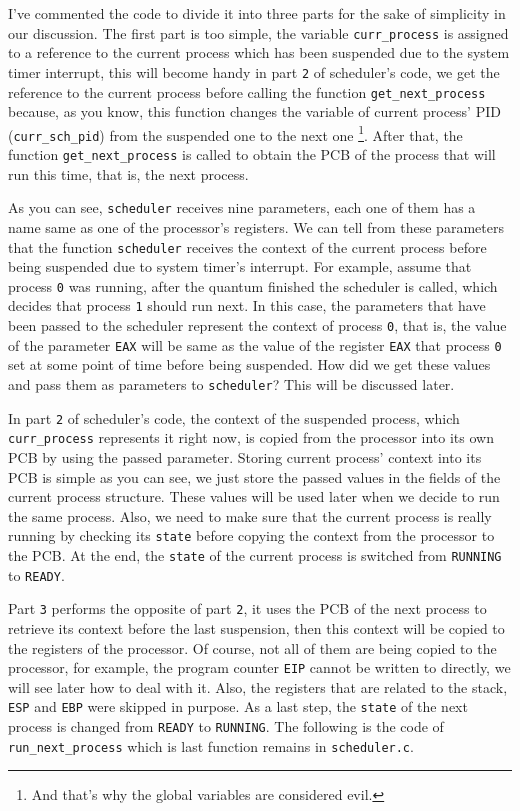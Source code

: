 I've commented the code to divide it into three parts for the sake of
simplicity in our discussion. The first part is too simple, the variable
\lstinline!curr_process! is assigned to a reference to the current
process which has been suspended due to the system timer interrupt, this
will become handy in part \lstinline!2! of scheduler's code, we get the
reference to the current process before calling the function
\lstinline!get_next_process! because, as you know, this function changes
the variable of current process' PID (\lstinline!curr_sch_pid!) from the
suspended one to the next one \footnote{And that's why the global
  variables are considered evil.}. After that, the function
\lstinline!get_next_process! is called to obtain the PCB of the process
that will run this time, that is, the next process.

As you can see, \lstinline!scheduler! receives nine parameters, each one
of them has a name same as one of the processor's registers. We can tell
from these parameters that the function \lstinline!scheduler! receives
the context of the current process before being suspended due to system
timer's interrupt. For example, assume that process \lstinline!0! was
running, after the quantum finished the scheduler is called, which
decides that process \lstinline!1! should run next. In this case, the
parameters that have been passed to the scheduler represent the context
of process \lstinline!0!, that is, the value of the parameter
\lstinline!EAX! will be same as the value of the register
\lstinline!EAX! that process \lstinline!0! set at some point of time
before being suspended. How did we get these values and pass them as
parameters to \lstinline!scheduler!? This will be discussed later.

In part \lstinline!2! of scheduler's code, the context of the suspended
process, which \lstinline!curr_process! represents it right now, is
copied from the processor into its own PCB by using the passed
parameter. Storing current process' context into its PCB is simple as
you can see, we just store the passed values in the fields of the
current process structure. These values will be used later when we
decide to run the same process. Also, we need to make sure that the
current process is really running by checking its \lstinline!state!
before copying the context from the processor to the PCB. At the end,
the \lstinline!state! of the current process is switched from
\lstinline!RUNNING! to \lstinline!READY!.

Part \lstinline!3! performs the opposite of part \lstinline!2!, it uses
the PCB of the next process to retrieve its context before the last
suspension, then this context will be copied to the registers of the
processor. Of course, not all of them are being copied to the processor,
for example, the program counter \lstinline!EIP! cannot be written to
directly, we will see later how to deal with it. Also, the registers
that are related to the stack, \lstinline!ESP! and \lstinline!EBP! were
skipped in purpose. As a last step, the \lstinline!state! of the next
process is changed from \lstinline!READY! to \lstinline!RUNNING!. The
following is the code of \lstinline!run_next_process! which is last
function remains in \lstinline!scheduler.c!.

